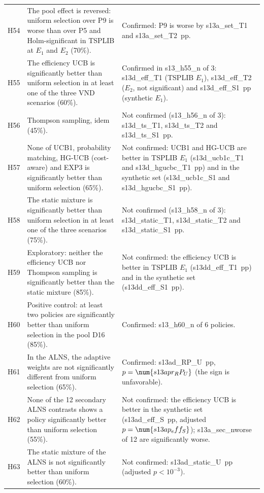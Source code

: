 \begin{center}
\begin{longtable}{>{\raggedright\arraybackslash}p{0.9cm}>{\raggedright\arraybackslash}p{5.2cm}>{\raggedright\arraybackslash}p{8.5cm}}
H54 & The pool effect is reversed: uniform selection over P9 is worse than over P5 and Holm-significant in TSPLIB at $E_1$ and $E_2$ (70\%). & Confirmed: P9 is worse by \num{s13a_set_T1} and \num{s13a_set_T2}~pp. \\
H55 & The efficiency UCB is significantly better than uniform selection in at least one of the three VND scenarios (60\%). & Confirmed in \num{s13_h55_n} of 3: \num{s13d_eff_T1} (TSPLIB $E_1$), \num{s13d_eff_T2} ($E_2$, not significant) and \num{s13d_eff_S1}~pp (synthetic $E_1$). \\
H56 & Thompson sampling, idem (45\%). & Not confirmed (\num{s13_h56_n} of 3): \num{s13d_ts_T1}, \num{s13d_ts_T2} and \num{s13d_ts_S1}~pp. \\
H57 & None of UCB1, probability matching, HG-UCB (cost-aware) and EXP3 is significantly better than uniform selection (65\%). & Not confirmed: UCB1 and HG-UCB are better in TSPLIB $E_1$ (\num{s13d_ucb1c_T1} and \num{s13d_hgucbc_T1}~pp) and in the synthetic set (\num{s13d_ucb1c_S1} and \num{s13d_hgucbc_S1}~pp). \\
H58 & The static mixture is significantly better than uniform selection in at least one of the three scenarios (75\%). & Not confirmed (\num{s13_h58_n} of 3): \num{s13d_static_T1}, \num{s13d_static_T2} and \num{s13d_static_S1}~pp. \\
H59 & Exploratory: neither the efficiency UCB nor Thompson sampling is significantly better than the static mixture (85\%). & Not confirmed: the efficiency UCB is better in TSPLIB $E_1$ (\num{s13dd_eff_T1}~pp) and in the synthetic set (\num{s13dd_eff_S1}~pp). \\
H60 & Positive control: at least two policies are significantly better than uniform selection in the pool D16 (85\%). & Confirmed: \num{s13_h60_n} of 6 policies. \\
H61 & In the ALNS, the adaptive weights are not significantly different from uniform selection (65\%). & Confirmed: \num{s13ad_RP_U}~pp, $p=\num{s13apr_RP_U}$ (the sign is unfavorable). \\
H62 & None of the 12 secondary ALNS contrasts shows a policy significantly better than uniform selection (55\%). & Not confirmed: the efficiency UCB is better in the synthetic set (\num{s13ad_eff_S}~pp, adjusted $p=\num{s13ap_eff_S}$); \num{s13a_sec_nworse} of 12 are significantly worse. \\
H63 & The static mixture of the ALNS is not significantly better than uniform selection (60\%). & Not confirmed: \num{s13ad_static_U}~pp (adjusted $p<10^{-3}$). \\

\end{longtable}
\end{center}
